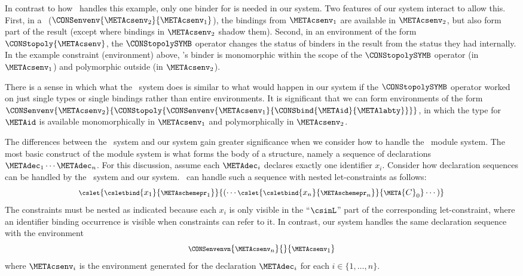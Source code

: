 \documentclass{jfp1}
\newcommand{\sizeintablesp}{footnotesize}
\begin{document}
In contrast to how \PR\ handles this example, only one binder for
 is needed in our system.
Two features of our system interact to allow this.
First, in a \COMPENV\
($\CONSenvenv{\METAcsenv_2}{\METAcsenv_1}$), the bindings from
$\METAcsenv_1$ are available in $\METAcsenv_2$, but also form part of
the result (except where bindings in $\METAcsenv_2$ shadow them).
Second, in an environment of the form $\CONStopoly{\METAcsenv}$, the
$\CONStopolySYMB$ operator changes the status of binders in the
result from the status they had internally.
In the example constraint (environment) above, 's
binder is monomorphic within the scope of the $\CONStopolySYMB$
operator (in $\METAcsenv_1$) and polymorphic outside (in $\METAcsenv_2$).

There is a sense in which what the \PR\ system does is similar to what
would happen in our system if the $\CONStopolySYMB$ operator worked on
just single types or single bindings rather than entire environments.
It is significant that we can form environments of the form
\(
  \CONSenvenv
    {\METAcsenv_2}
    {\CONStopoly
       {
        \CONSenvenv
          {\METAcsenv_1}
          {\CONSbind{\METAid}
                    {\METAlabty}
          }
       }}
\),
\relax
in which the type for $\METAid$ is available monomorphically in
${\METAcsenv_1}$ and polymorphically in ${\METAcsenv_2}$.

The differences between the \PR\ system and our system gain greater
significance when we consider how to handle the \SML\ module system.
The most basic construct of the module system is what forms the body
of a structure, namely
a sequence of declarations
$\METAdec_1\cdots\METAdec_n$.
For this discussion, assume each $\METAdec_i$ declares exactly one
identifier $x_i$.
Consider how declaration sequences can be handled by the \PR\ system and
our system.
\PR\ can handle such a sequence with nested let-constraints as
follows:
$$
\begin{\sizeintablesp}
\cslet{\csletbind{x_1}{\METAschemepr_1}}{(\cdots\cslet{\csletbind{x_n}{\METAschemepr_n}}{\META{C}_0}\cdots)}
\end{\sizeintablesp}
$$
%
The constraints must be nested as indicated because each $x_i$ is only
visible in the ``$\csinL$'' part of the corresponding
let-constraint, where an identifier binding occurrence is
visible when constraints can refer to it.
In contrast, our system handles the same declaration sequence with the
environment
$$
\begin{\sizeintablesp}
\CONSenvenvn{\METAcsenv_n}{}{\METAcsenv_1}
\end{\sizeintablesp}
$$
where $\METAcsenv_i$ is the environment generated for the declaration
$\METAdec_i$ for each $i\in\{1,\ldots,n\}$.
\end{document}
